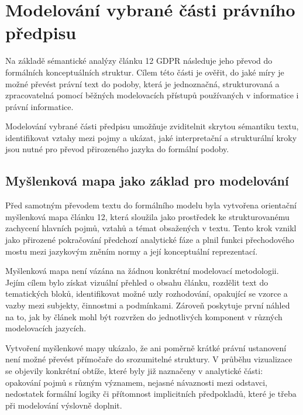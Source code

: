 
\section{Modelování vybrané části právního předpisu}
\label{sec:modelovani-vybrane-casti-pravniho-predpisu}
Na základě sémantické analýzy článku 12 GDPR následuje jeho převod do formálních konceptuálních struktur. Cílem této části je ověřit, do jaké míry je možné převést právní text do podoby, která je jednoznačná, strukturovaná a zpracovatelná pomocí běžných modelovacích přístupů používaných v informatice i právní informatice.

Modelování vybrané části předpisu umožňuje zviditelnit skrytou sémantiku textu, identifikovat vztahy mezi pojmy a ukázat, jaké interpretační a strukturální kroky jsou nutné pro převod přirozeného jazyka do formální podoby.


\subsection{Myšlenková mapa jako základ pro modelování}
\label{sec:myslenkova-mapa-jako-zaklad-pro-modelovani}
Před samotným převodem textu do formálního modelu byla vytvořena orientační myšlenková mapa článku 12, která sloužila jako prostředek ke strukturovanému zachycení hlavních pojmů, vztahů a témat obsažených v textu. Tento krok vznikl jako přirozené pokračování předchozí analytické fáze a plnil funkci přechodového mostu mezi jazykovým zněním normy a její konceptuální reprezentací.

Myšlenková mapa není vázána na žádnou konkrétní modelovací metodologii. Jejím cílem bylo získat vizuální přehled o obsahu článku, rozdělit text do tematických bloků, identifikovat možné uzly rozhodování, opakující se vzorce a vazby mezi subjekty, činnostmi a podmínkami. Zároveň poskytuje první náhled na to, jak by článek mohl být rozvržen do jednotlivých komponent v různých modelovacích jazycích.

Vytvoření myšlenkové mapy ukázalo, že ani poměrně krátké právní ustanovení není možné převést přímočaře do srozumitelné struktury. V průběhu vizualizace se objevily konkrétní obtíže, které byly již naznačeny v analytické části: opakování pojmů s různým významem, nejasné návaznosti mezi odstavci, nedostatek formální logiky či přítomnost implicitních předpokladů, které je třeba při modelování výslovně doplnit.

